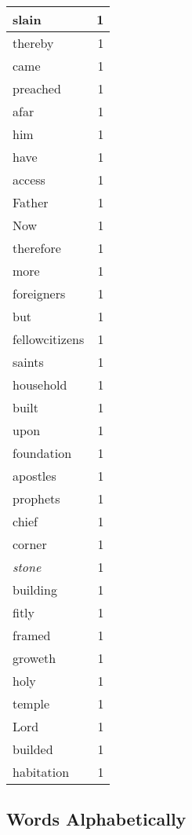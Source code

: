 \begin{center}
\begin{longtable}{l|r}
slain & 1\\ \hline 
thereby & 1\\ \hline 
came & 1\\ \hline 
preached & 1\\ \hline 
afar & 1\\ \hline 
him & 1\\ \hline 
have & 1\\ \hline 
access & 1\\ \hline 
Father & 1\\ \hline 
Now & 1\\ \hline 
therefore & 1\\ \hline 
more & 1\\ \hline 
foreigners & 1\\ \hline 
but & 1\\ \hline 
fellowcitizens & 1\\ \hline 
saints & 1\\ \hline 
household & 1\\ \hline 
built & 1\\ \hline 
upon & 1\\ \hline 
foundation & 1\\ \hline 
apostles & 1\\ \hline 
prophets & 1\\ \hline 
chief & 1\\ \hline 
corner & 1\\ \hline 
\emph{stone} & 1\\ \hline 
building & 1\\ \hline 
fitly & 1\\ \hline 
framed & 1\\ \hline 
groweth & 1\\ \hline 
holy & 1\\ \hline 
temple & 1\\ \hline 
Lord & 1\\ \hline 
builded & 1\\ \hline 
habitation & 1\\ \hline 
\end{longtable}  
\end{center}  


  
\normalsize  

  
  


\subsection{Words Alphabetically}

